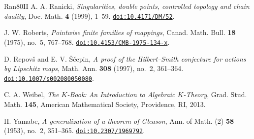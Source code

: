 \documentclass[11pt]{amsart}
\newcommand{\doi}[1]{\href{https://doi.org/#1}{\nolinkurl{doi:#1}}}
\numberwithin{equation}{section}
\theoremstyle{definition}
\theoremstyle{remark}
\begin{document}
\begin{thebibliography}{Ran80II}
A. A. Ranicki,
\emph{Singularities, double points, controlled topology and chain duality},
Doc. Math. \textbf{4} (1999), 1--59.
\doi{10.4171/DM/52}.

J. W. Roberts,
\emph{Pointwise finite families of mappings},
Canad. Math. Bull. \textbf{18} (1975), no.~5, 767--768.
\doi{10.4153/CMB-1975-134-x}.

D. Repov\v{s} and E. V. \v{S}\v{c}epin,
\emph{A proof of the Hilbert--Smith conjecture for actions by Lipschitz maps},
Math. Ann. \textbf{308} (1997), no.~2, 361--364.
\doi{10.1007/s002080050080}.

C. A. Weibel,
\emph{The $K$-Book: An Introduction to Algebraic $K$-Theory},
Grad. Stud. Math. \textbf{145}, American Mathematical Society,
Providence, RI, 2013.

H. Yamabe,
\emph{A generalization of a theorem of Gleason},
Ann. of Math. (2) \textbf{58} (1953), no.~2, 351--365.
\doi{10.2307/1969792}.

\enlargethispage{2\baselineskip}
\end{thebibliography}
\end{document}
